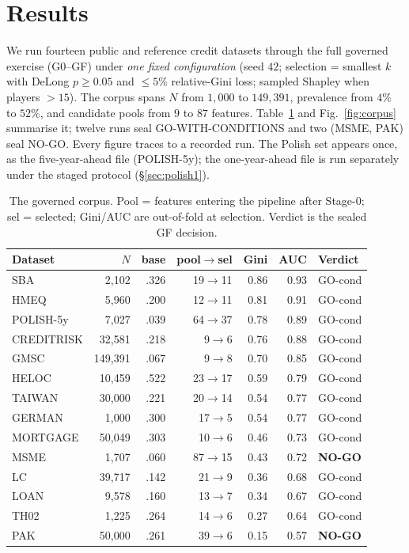 \documentclass[9pt,journal]{IEEEtai}
\begin{document}
\section{Results}\label{sec:results}
We run fourteen public and reference credit datasets through the full governed exercise
(G0--GF) under \emph{one fixed configuration} (seed $42$; selection = smallest $k$ with DeLong
$p\ge0.05$ and $\le5\%$ relative-Gini loss; sampled Shapley when players $>15$). The corpus
spans $N$ from $1{,}000$ to $149{,}391$, prevalence from $4\%$ to $52\%$, and candidate pools
from $9$ to $87$ features. Table~\ref{tab:corpus} and Fig.~\ref{fig:corpus} summarise it; twelve
runs seal GO-WITH-CONDITIONS and two (MSME, PAK) seal NO-GO. Every figure traces to a recorded
run. The Polish set appears once, as the five-year-ahead file (POLISH-5y); the one-year-ahead file is
run separately under the staged protocol (\S\ref{sec:polish1}).

\begin{table}[!t]
\centering
\caption{The governed corpus. Pool = features entering the pipeline after Stage-0; sel = selected;
Gini/AUC are out-of-fold at selection. Verdict is the sealed GF decision.}
\label{tab:corpus}
\footnotesize
\begin{tabular}{@{}lrrrrrl@{}}
\toprule
Dataset & $N$ & base & pool$\to$sel & Gini & AUC & Verdict \\
\midrule
SBA        & 2{,}102   & .326 & 19$\to$11 & 0.86 & 0.93 & GO-cond \\
HMEQ       & 5{,}960   & .200 & 12$\to$11 & 0.81 & 0.91 & GO-cond \\
POLISH-5y  & 7{,}027   & .039 & 64$\to$37 & 0.78 & 0.89 & GO-cond \\
CREDITRISK & 32{,}581  & .218 & 9$\to$6   & 0.76 & 0.88 & GO-cond \\
GMSC       & 149{,}391 & .067 & 9$\to$8   & 0.70 & 0.85 & GO-cond \\
HELOC      & 10{,}459  & .522 & 23$\to$17 & 0.59 & 0.79 & GO-cond \\
TAIWAN     & 30{,}000  & .221 & 20$\to$14 & 0.54 & 0.77 & GO-cond \\
GERMAN     & 1{,}000   & .300 & 17$\to$5  & 0.54 & 0.77 & GO-cond \\
MORTGAGE   & 50{,}049  & .303 & 10$\to$6  & 0.46 & 0.73 & GO-cond \\
MSME       & 1{,}707   & .060 & 87$\to$15 & 0.43 & 0.72 & \textbf{NO-GO} \\
LC         & 39{,}717  & .142 & 21$\to$9  & 0.36 & 0.68 & GO-cond \\
LOAN       & 9{,}578   & .160 & 13$\to$7  & 0.34 & 0.67 & GO-cond \\
TH02       & 1{,}225   & .264 & 14$\to$6  & 0.27 & 0.64 & GO-cond \\
PAK        & 50{,}000  & .261 & 39$\to$6  & 0.15 & 0.57 & \textbf{NO-GO} \\
\bottomrule
\end{tabular}
\end{table}
\end{document}
